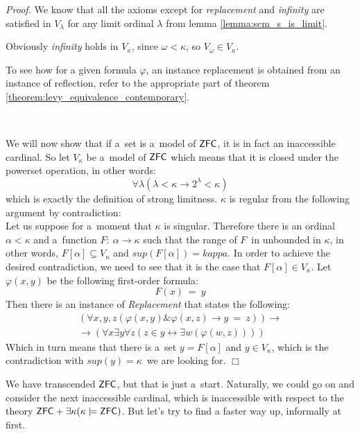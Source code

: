 \documentclass[12pt,a4paper]{article}
\newenvironment{proof}
{\noindent \textit{Proof.}}
{\hspace*{\fill} $\Box$}
\renewcommand{\iff}{\leftrightarrow}
\newcommand{\then}{\rightarrow}
\newcommand{\et}{\mathrel{\&}}
\begin{document}
\begin{proof}
We know that all the axioms except for \emph{replacement} and \emph{infinity} are satisfied in $V_\lambda$ for any limit ordinal $\lambda$ from lemma \ref{lemma:scm_s_is_limit}.

Obviously \emph{infinity} holds in $V_\kappa$, since $\omega < \kappa$, so $V_\omega \in V_\kappa$.

To see how for a given formula $\varphi$, an instance replacement is obtained from an instance of reflection, refer to the appropriate part of theorem \ref{theorem:levy_equivalence_contemporary}.

\

We will now show that if a~set is a~model of $\sf{ZFC}$, it is in fact an inaccessible cardinal. So let $V_\kappa$ be a~model of $\sf{ZFC}$ which means that it is closed under the powerset operation, in other words:
\begin{equation}
\forall \lambda (\lambda < \kappa \then 2^{\lambda} < \kappa)
\end{equation}
which is exactly the definition of strong limitness. $\kappa$ is regular from the following argument by contradiction:\\
Let us suppose for a~moment that $\kappa$ is singular. Therefore there is an ordinal $\alpha < \kappa$ and a~function $F:\ \alpha \then \kappa$ such that the range of $F$ in unbounded in $\kappa$, in other words, $F[\alpha] \subseteq V_\kappa$ and $sup(F[\alpha]) = kappa$. In order to achieve the desired contradiction, we need to see that it is the case that $F[\alpha] \in V_\kappa$. Let $\varphi(x, y)$ be the following first-order formula:
\begin{equation}
F(x)\ =\ y
\end{equation}
Then there is an instance of \emph{Replacement} that states the following:
\begin{equation}
\begin{gathered}
(\forall x, y, z(\varphi(x, y) \et \varphi(x, z) \then y\ =\ z)) \then \\
\then (\forall x \exists y \forall z (z \in y \iff \exists w (\varphi(w, z))))
\end{gathered}
\end{equation}
Which in turn means that there is a~set $y = F[\alpha]$ and $y \in V_\kappa$, which is the contradiction with $sup(y) = \kappa$ we are looking for.
\end{proof}

We have transcended $\sf{ZFC}$, but that is just a~start. Naturally, we could go on and consider the next inaccessible cardinal, which is inaccessible with respect to the theory $\sf{ZFC} + \exists \kappa (\kappa \models \sf{ZFC})$. But let's try to find a faster way up, informally at first. 
\end{document}
